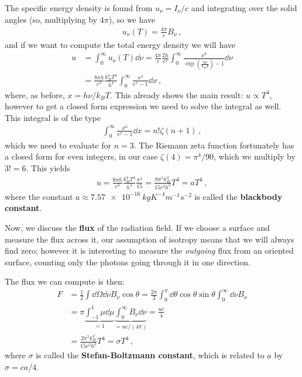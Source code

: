 \documentclass[main.tex]{subfiles}
\begin{document}
The specific energy density is found from \(u_\nu = I_\nu / c\) and integrating over the solid angles (so, multiplying by \(4 \pi \)), so we have 
%
\begin{align}
u_\nu (T) = \frac{4 \pi }{c} B_\nu 
\,,
\end{align}
%
and if we want to compute the total energy density we will have 
%
\begin{align}
u &= \int_{0}^{ \infty } u_\nu (T) \dd{\nu } = \frac{4\pi}{c} \frac{2h}{c^2} \int_{0}^{\infty } \frac{\nu^3}{\exp( \frac{h\nu}{k_B T} ) -1 } \dd{\nu }  \\
&= \frac{8 \pi h}{c^3} \frac{k_B^4 T^{4}}{h^{4}} \int_{0}^{\infty } \frac{x^3}{e^{x} -1} \dd{x}
\,,
\end{align}
%
where, as before, \(x = h \nu / k_B T\). This already shows the main result: \(u \propto T^{4}\), however to get a closed form expression we need to solve the integral as well.
This integral is of the type
%
\begin{align}
\int_{0}^{\infty } \frac{x^{n}}{e^{x} -1} \dd{x}   = n! \zeta (n+1)
\,,
\end{align}
%
which we need to evaluate for \(n = 3\). The Riemann zeta function fortunately has a closed form for even integers, in our case \(\zeta (4) = \pi^{4} / 90\), which we multiply by \(3! = 6\). This yields 
%
\begin{align}
u = \frac{8 \pi h}{c^3} \frac{k_B^4 T^{4}}{h^{4}} \frac{\pi^{4}}{15}
= \frac{8 \pi^{5}k_B^{4}}{15 c^3 h^3} T^{4} = aT^{4}
\,,
\end{align}
%
where the constant \(a \approx \SI{7.57e-16}{kg K^{-4} m^{-1} s^{-2}}\) is called the \textbf{blackbody constant}. 

Now, we discuss the \textbf{flux} of the radiation field. If we choose a surface and measure the flux across it, our assumption of isotropy means that we will always find zero; however it is interesting to measure the \emph{outgoing} flux from an oriented surface, counting only the photons going through it in one direction. 


The flux we can compute is then: 
%
\begin{align}
F &= \frac{1}{2}  \int \dd{\Omega } \dd{\nu } B_\nu \cos \theta 
= \frac{2 \pi }{2} \int_{0}^{\pi } \dd{\theta } \cos \theta \sin \theta \int_{0}^{\infty } \dd{\nu } B_\nu   \\
&= \pi \underbrace{\int_{-1}^{1} \mu \dd{\mu }}_{=1} \underbrace{\int_{0}^{\infty } B_\nu \dd{\nu }}_{= u c / (4 \pi )} = \frac{uc}{4}
 \\
&= \frac{2 \pi^{5} k_B^{4}}{15 c^2h^3} T^{4}
= \sigma T^{4}
\,,
\end{align}
%
where \(\sigma \) is called the \textbf{Stefan-Boltzmann constant}, which is related to \(a\) by \(\sigma = ca / 4\). 
\end{document}
